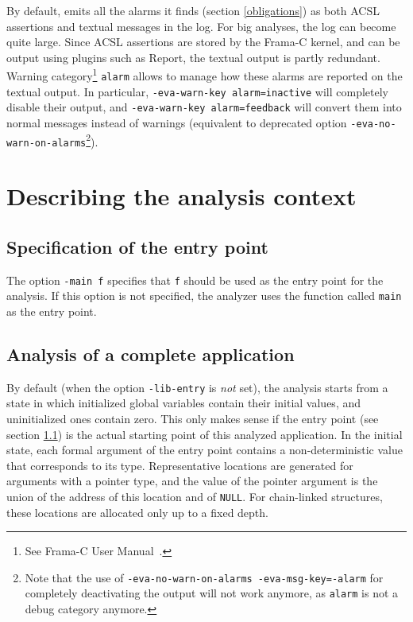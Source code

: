 \documentclass{frama-c-book}
\begin{document}
By default, \Eva{} emits all the alarms it finds (section
\ref{obligations}) as both ACSL assertions and textual messages in the
log. For big analyses, the log can become quite large. Since ACSL
assertions are stored by the Frama-C kernel, and can be output using
plugins such as Report, the textual output is partly redundant. Warning
category\footnote{See Frama-C User Manual~\cite{FCUserMan}.}
\texttt{alarm} allows to manage how these alarms are reported on the
textual output. In particular, \texttt{-eva-warn-key alarm=inactive} will
completely disable their output, and \texttt{-eva-warn-key alarm=feedback}
will convert them into normal messages instead of warnings
(equivalent to deprecated option
\texttt{-eva-no-warn-on-alarms}\footnote{Note that the use of
  \texttt{-eva-no-warn-on-alarms -eva-msg-key=-alarm} for completely
  deactivating the output will not work anymore, as \texttt{alarm} is not a
  debug category anymore.}).

\section{Describing the analysis context}
\label{context}

\subsection{Specification of the entry point}
\label{entry}

The option \lstinline|-main f| specifies that \lstinline|f| should be
used as the entry point for the analysis. If this option is
not specified, the analyzer uses the function called \lstinline|main|
as the entry point.

\subsection{Analysis of a complete application}
\label{complete}

By default (when the option \lstinline|-lib-entry| is {\em not} set),
the analysis starts from a state
in which initialized global variables
contain their initial values, and uninitialized ones contain zero.
This only makes sense if the entry point (see section \ref{entry}) is
the actual starting point of this analyzed application.
In the initial state, each formal argument of the entry point contains
a non-deterministic value that corresponds to its type. Representative
locations are generated for arguments with a pointer type,
and the value of the pointer argument is the union of the address
of this location and of \lstinline|NULL|. For chain-linked structures,
these locations are allocated only up to a fixed depth.
\end{document}

